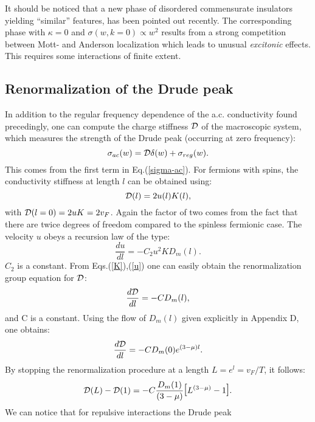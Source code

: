 It should be noticed 
that a new phase of disordered commensurate insulators 
yielding ``similar'' features, has been pointed out 
recently\cite{Edmond-Thierry-Pierre}. The corresponding phase 
with $\kappa=0$ and $\sigma(w,k=0)\propto w^2$
results from
a strong competition between Mott- and Anderson localization
which leads to unusual {\it excitonic} effects. This requires
some interactions of finite extent.

\subsection{Renormalization of the Drude peak}

In addition to the regular frequency
dependence of the a.c. conductivity found precedingly, one can
compute the charge stiffness ${\cal D}$ of the macroscopic
system, which measures the
strength of the Drude peak (occurring at zero frequency):
\begin{equation}
\sigma_{ac}(w)={\cal D}\delta(w)+\sigma_{reg}(w).
\end{equation}
This comes from the first term in Eq.(\ref{sigma-ac}).
For fermions with spins, the conductivity
stiffness at length $l$ can be obtained using:
\begin{equation}
{\cal D}(l)=2u(l)K(l),
\end{equation}
with ${\cal D}(l=0)=2uK=2v_F$.
Again the factor of two comes from the fact that there are twice degrees
of freedom compared to the spinless fermionic case. The velocity $u$ obeys
a recursion law of the type:
\begin{equation}
\label{u}
\frac{du}{dl}=-C_2u^2K D_m(l).
\end{equation}
$C_2$ is a constant. From Eqs.(\ref{K}),(\ref{u}) 
one can easily obtain the renormalization
group equation for ${\cal D}$:
\begin{equation}
\frac{d{\cal D}}{dl}=-CD_m(l),
\end{equation}
and C is a constant. Using the flow of $D_m(l)$ given explicitly in Appendix
D, one obtains:
\begin{equation}
\frac{d{\cal D}}{dl}=-CD_m(0)e^{(3-\mu)l}.
\end{equation}
By stopping the renormalization procedure at a length
$L=e^l=v_F/T$, it follows:
\begin{equation}
\label{jumpa}
{\cal D}(L)-{\cal D}(1)=-C\frac{D_m(1)}{(3-\mu)}\hbox{\Large[}
L^{(3-\mu)}-1\hbox{\Large]}.
\end{equation}
We can notice that for repulsive interactions the Drude peak 
